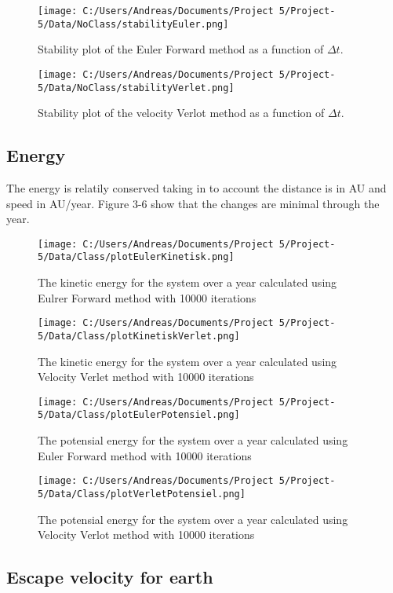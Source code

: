 \documentclass[twoside,twocolumn]{article}
\begin{document}
\begin{figure}[H]  \texttt{[image: C:/Users/Andreas/Documents/Project 5/Project-5/Data/NoClass/stabilityEuler.png]}
  \caption{Stability plot of the Euler Forward method as a function of $\Delta t$.}
  \label{fig:boat1}
\end{figure}
\begin{figure}[H]  \texttt{[image: C:/Users/Andreas/Documents/Project 5/Project-5/Data/NoClass/stabilityVerlet.png]}
  \caption{Stability plot of the velocity Verlot method as a function of $\Delta t$.}
  \label{fig:boat2}
\end{figure}

\subsection{Energy}

The energy is relatily conserved taking in to account the distance is in AU and speed in AU/year. Figure 3-6 show that the changes are minimal through the year.
\begin{figure}[H]  \texttt{[image: C:/Users/Andreas/Documents/Project 5/Project-5/Data/Class/plotEulerKinetisk.png]}
  \caption{The kinetic energy for the system over a year calculated using Eulrer Forward method with 10000 iterations}
  \label{fig:boat2}
\end{figure}
\begin{figure}[H]  \texttt{[image: C:/Users/Andreas/Documents/Project 5/Project-5/Data/Class/plotKinetiskVerlet.png]}
  \caption{The kinetic energy for the system over a year calculated using Velocity Verlet method with 10000 iterations}
  \label{fig:boat2}
\end{figure}
\begin{figure}[H]  \texttt{[image: C:/Users/Andreas/Documents/Project 5/Project-5/Data/Class/plotEulerPotensiel.png]}
  \caption{The potensial energy for the system over a year calculated using Euler Forward method with 10000 iterations}
  \label{fig:boat2}
\end{figure}
\begin{figure}[H]  \texttt{[image: C:/Users/Andreas/Documents/Project 5/Project-5/Data/Class/plotVerletPotensiel.png]}
  \caption{The potensial energy for the system over a year calculated using Velocity Verlot method with 10000 iterations}
  \label{fig:boat2}
\end{figure}


\subsection{Escape velocity for earth}
\end{document}
